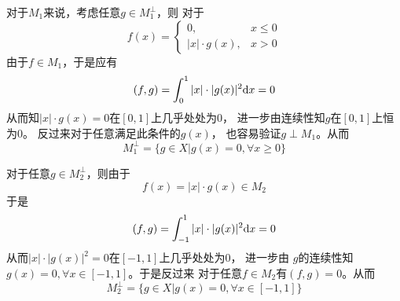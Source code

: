 \documentclass[cn]{homework}
\begin{document}
    \problem
    \newcommand{\cg}{\overline}
    对于$M_1$来说，考虑任意$g\in M_1^\perp$，则
    对于
    \[f(x)=\begin{cases}
        0,&x\leq 0\\
        |x|\cdot g(x),&x>0
    \end{cases}\]
    由于$f\in M_1$，于是应有
    \[(f,g)=\int_0^1|x|\cdot|g(x)|^2\mathrm d x=0\]
    从而知$|x|\cdot g(x)=0$在$[0,1]$上几乎处处为$0$，
    进一步由连续性知$g$在$[0,1]$上恒为$0$。
    反过来对于任意满足此条件的$g(x)$，
    也容易验证$g\perp M_1$。从而
    \[M_1^\perp=\{g\in X|g(x)=0,\forall x\geq 0\}\]

    对于任意$g\in M_2^\perp$，则由于
    \[f(x)=|x|\cdot g(x)\in M_2\]
    于是
    \[(f,g)=\int_{-1}^1|x|\cdot|g(x)|^2\mathrm d x=0\]
    从而$|x|\cdot |g(x)|^2=0$在$[-1,1]$上几乎处处为$0$，
    进一步由
    $g$的连续性知$g(x)=0,\forall x\in[-1,1]$。于是反过来
    对于任意$f\in M_2$有$(f,g)=0$。从而
    \[M_2^\perp=\{g\in X|g(x)=0,\forall x\in[-1,1]\}\]
\end{document}
